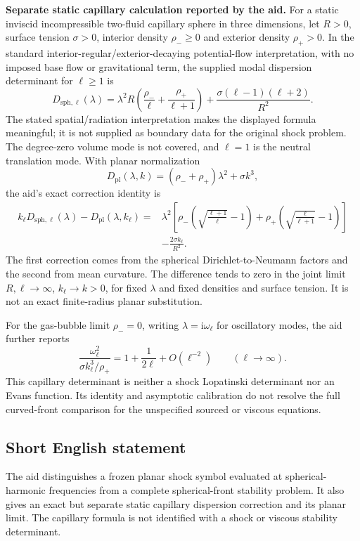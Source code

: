 \documentclass[11pt]{article}
\begin{document}
\textbf{Separate static capillary calculation reported by the aid.} For a static inviscid incompressible two-fluid capillary sphere in three dimensions, let \(R>0\), surface tension \(\sigma>0\), interior density \(\rho_-\geq0\) and exterior density \(\rho_+>0\). In the standard interior-regular/exterior-decaying potential-flow interpretation, with no imposed base flow or gravitational term, the supplied modal dispersion determinant for \(\ell\geq1\) is
\[
 D_{\mathrm{sph},\ell}(\lambda)=
 \lambda^2R\left(\frac{\rho_-}{\ell}+\frac{\rho_+}{\ell+1}\right)
 +\frac{\sigma(\ell-1)(\ell+2)}{R^2}.
\]
The stated spatial/radiation interpretation makes the displayed formula meaningful; it is not supplied as boundary data for the original shock problem. The degree-zero volume mode is not covered, and \(\ell=1\) is the neutral translation mode. With planar normalization
\[
 D_{\mathrm{pl}}(\lambda,k)=(\rho_-+\rho_+)\lambda^2+\sigma k^3,
\]
the aid's exact correction identity is
\[
\begin{split}
 k_\ell D_{\mathrm{sph},\ell}(\lambda)-D_{\mathrm{pl}}(\lambda,k_\ell)
 ={}&\lambda^2\left[\rho_-\left(\sqrt{\frac{\ell+1}{\ell}}-1\right)
 +\rho_+\left(\sqrt{\frac{\ell}{\ell+1}}-1\right)\right]\\
 &-\frac{2\sigma k_\ell}{R^2}.
\end{split}
\]
The first correction comes from the spherical Dirichlet-to-Neumann factors and the second from mean curvature. The difference tends to zero in the joint limit \(R,\ell\to\infty\), \(k_\ell\to k>0\), for fixed \(\lambda\) and fixed densities and surface tension. It is not an exact finite-radius planar substitution.

For the gas-bubble limit \(\rho_-=0\), writing \(\lambda=\mathrm i\omega_\ell\) for oscillatory modes, the aid further reports
\[
 \frac{\omega_\ell^2}{\sigma k_\ell^3/\rho_+}
 =1+\frac{1}{2\ell}+O(\ell^{-2})\qquad(\ell\to\infty).
\]
This capillary determinant is neither a shock Lopatinski determinant nor an Evans function. Its identity and asymptotic calibration do not resolve the full curved-front comparison for the unspecified sourced or viscous equations.
\subsection{Short English statement}
The aid distinguishes a frozen planar shock symbol evaluated at spherical-harmonic frequencies from a complete spherical-front stability problem. It also gives an exact but separate static capillary dispersion correction and its planar limit. The capillary formula is not identified with a shock or viscous stability determinant.
\end{document}
